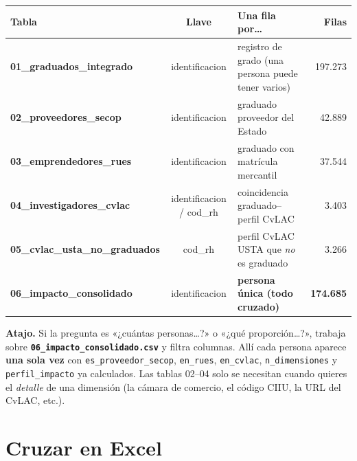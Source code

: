 \documentclass[11pt,letterpaper]{article}
\newcommand{\col}[1]{\texttt{\small #1}}
\newcommand{\file}[1]{{\small\textbf{\texttt{#1}}}}
\begin{document}
\begin{table}[H]\centering\small
\begin{tabularx}{\linewidth}{@{}>{\bfseries}l c >{\raggedright\arraybackslash}X r@{}}
\toprule
\rowcolor{ustaazul}\textbf{\color{white}Tabla} & \textbf{\color{white}Llave} & \textbf{\color{white}Una fila por\dots} & \textbf{\color{white}Filas} \\
\midrule
01\_graduados\_integrado      & identificacion & registro de grado (una persona puede tener varios) & 197.273 \\
\rowcolor{ustagrisclaro}
02\_proveedores\_secop        & identificacion & graduado proveedor del Estado & 42.889 \\
03\_emprendedores\_rues       & identificacion & graduado con matrícula mercantil & 37.544 \\
\rowcolor{ustagrisclaro}
04\_investigadores\_cvlac     & identificacion / cod\_rh & coincidencia graduado--perfil CvLAC & 3.403 \\
05\_cvlac\_usta\_no\_graduados & cod\_rh & perfil CvLAC USTA que \emph{no} es graduado & 3.266 \\
\rowcolor{ustacrema}
\textbf{06\_impacto\_consolidado} & identificacion & \textbf{persona única (todo cruzado)} & \textbf{174.685} \\
\bottomrule
\end{tabularx}
\end{table}

\begin{cajazul}
\textbf{Atajo.} Si la pregunta es «¿cuántas personas\dots?» o «¿qué proporción\dots?», trabaja sobre \file{06\_impacto\_consolidado.csv} y filtra columnas. Allí cada persona aparece \textbf{una sola vez} con \col{es\_proveedor\_secop}, \col{en\_rues}, \col{en\_cvlac}, \col{n\_dimensiones} y \col{perfil\_impacto} ya calculados. Las tablas 02--04 solo se necesitan cuando quieres el \emph{detalle} de una dimensión (la cámara de comercio, el código CIIU, la URL del CvLAC, etc.).
\end{cajazul}

\section{Cruzar en Excel}
\end{document}
